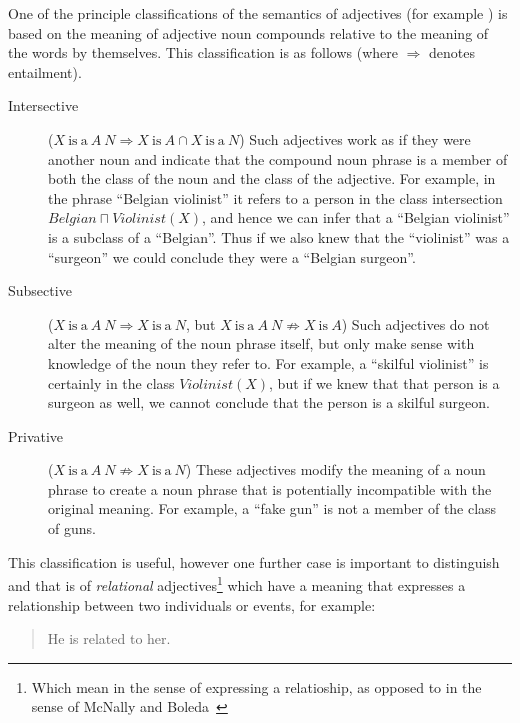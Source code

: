 \documentclass[11pt]{article}
\begin{document}
One of the principle classifications of the semantics of adjectives (for example \cite{partee2003there,bouillon1999description,morzycki2013modification}) is based on the meaning of adjective noun compounds relative to the meaning of the words by themselves. This classification is as follows (where $\Rightarrow$ denotes entailment).

\begin{description}
\item[Intersective] ($X\mathrm{~is~a~}A~N \Rightarrow X\mathrm{~is~}A \cap  X\mathrm{~is~a~}N$) 
Such adjectives work as if they were another noun and indicate that the compound 
noun phrase is a member of both the class of the noun and the class of the 
adjective. For example, in the phrase ``Belgian violinist'' it refers to a 
person in the class intersection $Belgian \sqcap Violinist(X)$, and hence we 
can infer that a ``Belgian violinist'' is a subclass of a ``Belgian''. 
Thus if we also knew that the ``violinist'' was a ``surgeon'' we could 
conclude they were a ``Belgian surgeon''.
\item[Subsective] ($X\mathrm{~is~a~}A~N \Rightarrow X\mathrm{~is~a~}N$, but $X\mathrm{~is~a~}A~N \not\Rightarrow X\mathrm{~is~}A$) 
Such adjectives do not alter the meaning of the noun phrase itself, but only 
make sense with knowledge of the noun they refer to. For example, a ``skilful 
violinist'' is certainly in the class $Violinist(X)$, but if we knew that that 
person is a surgeon as well, we cannot conclude that the person is a skilful surgeon. 
\item[Privative] ($X\mathrm{~is~a~}A~N \not\Rightarrow X\mathrm{~is~a~}N$) 
These adjectives modify the meaning of a noun phrase to create a noun phrase 
that is potentially incompatible with the original meaning. For example, a 
``fake gun'' is not a member of the class of guns.
\end{description}

This classification is useful, however one further case is important to 
distinguish and that is of \emph{relational} adjectives\footnote{Which mean in the sense of 
    expressing a relatioship, as opposed to in the sense of McNally and Boleda~}
    which have a meaning 
that expresses a relationship between two individuals or events, for example:

\begin{quote}

He is related to her.
\end{quote}
\end{document}
